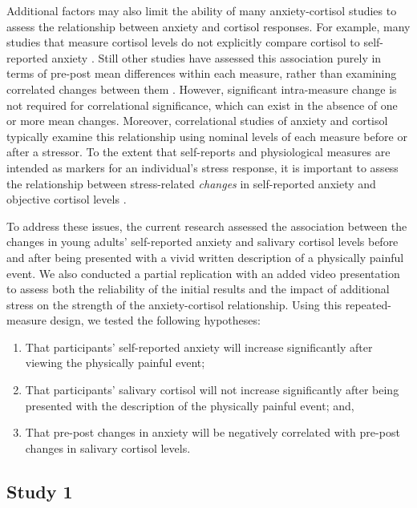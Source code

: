 \documentclass[review]{elsarticle}\usepackage[]{graphicx}\usepackage[]{color}
\begin{document}
Additional factors may also limit the ability of many anxiety-cortisol studies to assess the relationship between anxiety and cortisol responses.
For example, many studies that measure cortisol levels do not explicitly compare cortisol to self-reported anxiety \cite{steudte2011decreased}.
Still other studies have assessed this association purely in terms of pre-post mean differences within each measure, rather than examining correlated changes between them \cite{kudielka2009human}.
However, significant intra-measure change is not required for correlational significance, which can exist in the absence of one or more mean changes.
Moreover, correlational studies of anxiety and cortisol typically examine this relationship using nominal levels of each measure before or after a stressor.
To the extent that self-reports and physiological measures are intended as markers for an individual's stress response, it is important to assess the relationship between stress-related \emph{changes} in self-reported anxiety and objective cortisol levels \cite{blood1994spouses,harrell1996situational,walco2005procedural}.

To address these issues, the current research assessed the association between the changes in young adults' self-reported anxiety and salivary cortisol levels before and after being presented with a vivid written description of a physically painful event.
We also conducted a partial replication with an added video presentation to assess both the reliability of the initial results and the impact of additional stress on the strength of the anxiety-cortisol relationship.
Using this repeated-measure design, we tested the following hypotheses:

\begin{enumerate}
  \item That participants' self-reported anxiety will increase significantly after viewing the physically painful event;
  \item That participants' salivary cortisol will not increase significantly after being presented with the description of the physically painful event; and,
  \item That pre-post changes in anxiety will be negatively correlated with pre-post changes in salivary cortisol levels.
\end{enumerate}

\begin{center}
\section*{Study 1}
\label{sec:study1}
\end{center}
\end{document}
